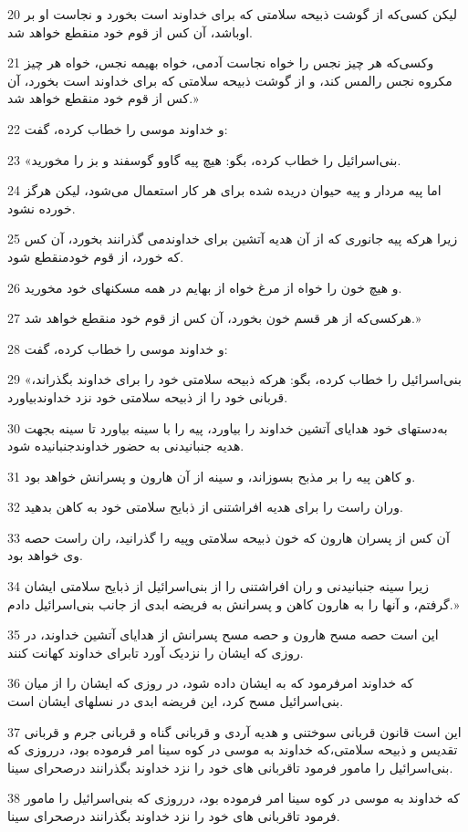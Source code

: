\par 20 لیکن کسی‌که از گوشت ذبیحه سلامتی که برای خداوند است بخورد و نجاست او بر اوباشد، آن کس از قوم خود منقطع خواهد شد.
\par 21 وکسی‌که هر چیز نجس را خواه نجاست آدمی، خواه بهیمه نجس، خواه هر چیز مکروه نجس رالمس کند، و از گوشت ذبیحه سلامتی که برای خداوند است بخورد، آن کس از قوم خود منقطع خواهد شد.»
\par 22 و خداوند موسی را خطاب کرده، گفت:
\par 23 «بنی‌اسرائیل را خطاب کرده، بگو: هیچ پیه گاوو گوسفند و بز را مخورید.
\par 24 اما پیه مردار و پیه حیوان دریده شده برای هر کار استعمال می‌شود، لیکن هرگز خورده نشود.
\par 25 زیرا هر‌که پیه جانوری که از آن هدیه آتشین برای خداوندمی گذرانند بخورد، آن کس که خورد، از قوم خودمنقطع شود.
\par 26 و هیچ خون را خواه از مرغ خواه از بهایم در همه مسکنهای خود مخورید.
\par 27 هرکسی‌که از هر قسم خون بخورد، آن کس از قوم خود منقطع خواهد شد.»
\par 28 و خداوند موسی را خطاب کرده، گفت:
\par 29 «بنی‌اسرائیل را خطاب کرده، بگو: هر‌که ذبیحه سلامتی خود را برای خداوند بگذراند، قربانی خود را از ذبیحه سلامتی خود نزد خداوندبیاورد.
\par 30 به‌دستهای خود هدایای آتشین خداوند را بیاورد، پیه را با سینه بیاورد تا سینه بجهت هدیه جنبانیدنی به حضور خداوندجنبانیده شود.
\par 31 و کاهن پیه را بر مذبح بسوزاند، و سینه از آن هارون و پسرانش خواهد بود.
\par 32 وران راست را برای هدیه افراشتنی از ذبایح سلامتی خود به کاهن بدهید.
\par 33 آن کس از پسران هارون که خون ذبیحه سلامتی وپیه را گذرانید، ران راست حصه وی خواهد بود.
\par 34 زیرا سینه جنبانیدنی و ران افراشتنی را از بنی‌اسرائیل از ذبایح سلامتی ایشان گرفتم، و آنها را به هارون کاهن و پسرانش به فریضه ابدی از جانب بنی‌اسرائیل دادم.»
\par 35 این است حصه مسح هارون و حصه مسح پسرانش از هدایای آتشین خداوند، در روزی که ایشان را نزدیک آورد تابرای خداوند کهانت کنند. 
\par 36 که خداوند امرفرمود که به ایشان داده شود، در روزی که ایشان را از میان بنی‌اسرائیل مسح کرد، این فریضه ابدی در نسلهای ایشان است.
\par 37 این است قانون قربانی سوختنی و هدیه آردی و قربانی گناه و قربانی جرم و قربانی تقدیس و ذبیحه سلامتی،که خداوند به موسی در کوه سینا امر فرموده بود، درروزی که بنی‌اسرائیل را مامور فرمود تاقربانی های خود را نزد خداوند بگذرانند درصحرای سینا.
\par 38 که خداوند به موسی در کوه سینا امر فرموده بود، درروزی که بنی‌اسرائیل را مامور فرمود تاقربانی های خود را نزد خداوند بگذرانند درصحرای سینا.
 
